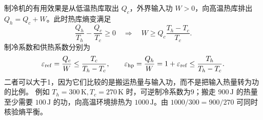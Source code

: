 制冷机的有用效果是从低温热库取出 $Q_c$，外界输入功 $W>0$，向高温热库排出
$Q_h=Q_c+W$。此时热库熵变满足
\[
 \frac{Q_h}{T_h}-\frac{Q_c}{T_c}\ge0
 \quad\Longrightarrow\quad
 W\ge Q_c\frac{T_h-T_c}{T_c}.
\]
制冷系数和供热系数分别为
\begin{equation}
 \varepsilon_{\rm ref}=\frac{Q_c}{W}\le\frac{T_c}{T_h-T_c},\qquad
 \varepsilon_{\rm hp}=\frac{Q_h}{W}=1+\varepsilon_{\rm ref}
 \le\frac{T_h}{T_h-T_c}.
\end{equation}
二者可以大于1，因为它们比较的是搬运热量与输入功，而不是把输入热量转为功的比例。
例如 $T_h=300\,\mathrm K,T_c=270\,\mathrm K$ 时，可逆制冷系数为9；搬走
$900\,\mathrm J$ 的热量至少需要 $100\,\mathrm J$ 的功，向高温环境排热为
$1000\,\mathrm J$。由 $1000/300=900/270$ 可同时核验熵平衡。
